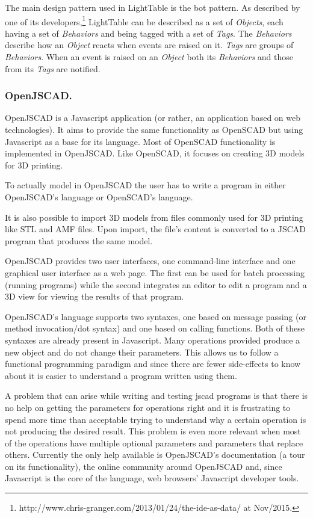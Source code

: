 \documentclass{./llncs2e/llncs}
\begin{document}
	The main design pattern used in LightTable is the \ac{bot} pattern. 
	As described by one of its developers,\footnote{http://www.chris-granger.com/2013/01/24/the-ide-as-data/ at Nov/2015.} LightTable can be described as a set of \emph{Objects}, each having a set of \emph{Behaviors} and being tagged with a set of \emph{Tags}. 
	The \emph{Behaviors} describe how an \emph{Object} reacts when events are raised on it. \emph{Tags} are groups of \emph{Behaviors}. 
	When an event is raised on an \emph{Object} both its \emph{Behaviors} and those from its \emph{Tags} are notified.

\subsubsection{OpenJSCAD.}
	OpenJSCAD\cite{openjscad2015site} is a Javascript application (or rather, an application based on web technologies).
	It aims to provide the same functionality as OpenSCAD\cite{kintel2011openscad} but using Javascript as a base for its language. 
	Most of OpenSCAD functionality is implemented in OpenJSCAD. 
	Like OpenSCAD, it focuses on creating 3D models for 3D printing.

	To actually model in OpenJSCAD the user has to write a program in either OpenJSCAD's language or OpenSCAD's language.

	It is also possible to import 3D models from files commonly used for 3D printing like STL and AMF files.
	Upon import, the file's content is converted to a JSCAD program that produces the same model. 

	OpenJSCAD provides two user interfaces, one command-line interface and one graphical user interface as a web page.
	The first can be used for batch processing (running programs) while the second integrates an editor to edit a program and a 3D view for viewing the results of that program.

	OpenJSCAD's language supports two syntaxes, one based on message passing (or method invocation/dot syntax) and one based on calling functions.
	Both of these syntaxes are already present in Javascript. 
	Many operations provided produce a new object and do not change their parameters. 
	This allows us to follow a functional programming paradigm and since there are fewer side-effects to know about it is easier to understand a program written using them.

	A problem that can arise while writing and testing jscad programs is that there is no help on getting the parameters for operations right and it is frustrating to spend more time than acceptable trying to understand why a certain operation is not producing the desired result. 
	This problem is even more relevant when most of the operations have multiple optional parameters and parameters that replace others. 
	Currently the only help available is OpenJSCAD's documentation (a tour on its functionality), the online community around OpenJSCAD and, since Javascript is the core of the language, web browsers' Javascript developer tools.
\end{document}
